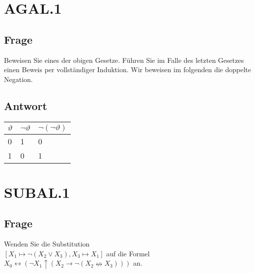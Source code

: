 \documentclass[12pt, a4paper]{article}
\begin{document}
\section*{AGAL.1}
\subsection*{Frage}
Beweisen Sie eines der obigen Gesetze. Führen Sie im Falle des letzten Gesetzes einen Beweis per vollständiger Induktion. Wir beweisen im folgenden die doppelte Negation.
\subsection*{Antwort}
\begin{tabular}{|l|l|l|}
\hline
$\vartheta$ & $\neg \vartheta$ & $\neg(\neg \vartheta)$\\ \hline
0 & 1 & 0\\
1 & 0 & 1\\
\hline
\end{tabular}

\section*{SUBAL.1}
\subsection*{Frage}
Wenden Sie die Substitution\\
$[X_{1} \longmapsto \neg (X_{2} \vee X_{3}), X_{3} \longmapsto X_{1}]$ auf die Formel
$ X_{0} \leftrightarrow (\neg X_{1} \uparrow (X_{2} \rightarrow \neg (X_{2} \nleftrightarrow X_{3})))$ an.\\
\end{document}

